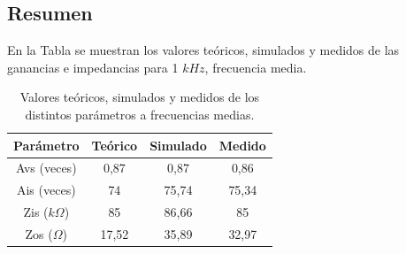 \subsection{Resumen}

En la Tabla \label{valores_frec_media} se muestran los valores teóricos, simulados y medidos de las ganancias e impedancias para 1 $kHz$, frecuencia media.

	\begin{table}[H]
		\centering
		\begin{tabular}{|c|c|c|c|}
		\hline
		Parámetro   	   & Teórico & Simulado & Medido \\ \hline
		Avs (veces) 	   & 0,87    & 0,87     & 0,86   \\ \hline
		Ais (veces)	   & 74      & 75,74    & 75,34  \\ \hline
		Zis ($k\Omega$)  & 85      & 86,66    & 85     \\ \hline
		Zos  ($\Omega$) & 17,52   & 35,89    & 32,97  \\ \hline
		\end{tabular}
		\caption{Valores teóricos, simulados y medidos de los distintos parámetros a frecuencias medias.}
		\label{valores_frec_media}
	\end{table}

